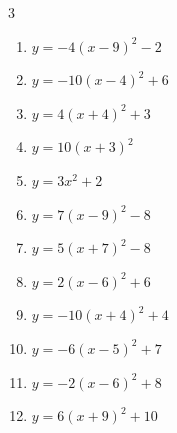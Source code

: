 \begin{multicols}{3}
\begin{enumerate}
  \item $\displaystyle y=-4\left( x-9\right)^{2}-2$

        \phantom{$\displaystyle 頂点\left( 9 , -2 \right)$}

  \item $\displaystyle y=-10\left( x-4\right)^{2}+6$

        \phantom{$\displaystyle 頂点\left( 4 , 6 \right)$}

  \item $\displaystyle y=4\left( x+4\right)^{2}+3$

        \phantom{$\displaystyle 頂点\left( -4 , 3 \right)$}

  \item $\displaystyle y=10\left( x+3\right)^{2}$

        \phantom{$\displaystyle 頂点\left( -3 , 0 \right)$}

  \item $\displaystyle y=3x^{2}+2$

        \phantom{$\displaystyle 頂点\left( 0 , 2 \right)$}

  \item $\displaystyle y=7\left( x-9\right)^{2}-8$

        \phantom{$\displaystyle 頂点\left( 9 , -8 \right)$}

  \item $\displaystyle y=5\left( x+7\right)^{2}-8$

        \phantom{$\displaystyle 頂点\left( -7 , -8 \right)$}

  \item $\displaystyle y=2\left( x-6\right)^{2}+6$

        \phantom{$\displaystyle 頂点\left( 6 , 6 \right)$}

  \item $\displaystyle y=-10\left( x+4\right)^{2}+4$

        \phantom{$\displaystyle 頂点\left( -4 , 4 \right)$}

  \item $\displaystyle y=-6\left( x-5\right)^{2}+7$

        \phantom{$\displaystyle 頂点\left( 5 , 7 \right)$}

  \item $\displaystyle y=-2\left( x-6\right)^{2}+8$

        \phantom{$\displaystyle 頂点\left( 6 , 8 \right)$}

  \item $\displaystyle y=6\left( x+9\right)^{2}+10$


\end{enumerate}
\end{multicols}
